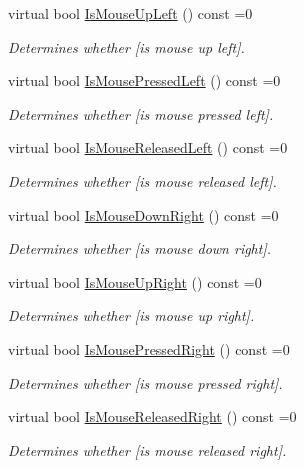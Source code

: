 \begin{DoxyCompactItemize}
virtual bool \hyperlink{class_i_input_handler_a2cfdd78fa0a66dc7a18ad6af3a710c69}{Is\+Mouse\+Up\+Left} () const  =0
\begin{DoxyCompactList}\small\item\em Determines whether \mbox{[}is mouse up left\mbox{]}. \end{DoxyCompactList}\item 
virtual bool \hyperlink{class_i_input_handler_a7bba4c4ed8beb9f01148ae927df6751d}{Is\+Mouse\+Pressed\+Left} () const  =0
\begin{DoxyCompactList}\small\item\em Determines whether \mbox{[}is mouse pressed left\mbox{]}. \end{DoxyCompactList}\item 
virtual bool \hyperlink{class_i_input_handler_a26cd44431cad42b32fbf507d6a6f04ea}{Is\+Mouse\+Released\+Left} () const  =0
\begin{DoxyCompactList}\small\item\em Determines whether \mbox{[}is mouse released left\mbox{]}. \end{DoxyCompactList}\item 
virtual bool \hyperlink{class_i_input_handler_a8c4e43a7249caf8e6edebe3b2f08ead2}{Is\+Mouse\+Down\+Right} () const  =0
\begin{DoxyCompactList}\small\item\em Determines whether \mbox{[}is mouse down right\mbox{]}. \end{DoxyCompactList}\item 
virtual bool \hyperlink{class_i_input_handler_ac182e58a22eea2d389ee14abdfb2c422}{Is\+Mouse\+Up\+Right} () const  =0
\begin{DoxyCompactList}\small\item\em Determines whether \mbox{[}is mouse up right\mbox{]}. \end{DoxyCompactList}\item 
virtual bool \hyperlink{class_i_input_handler_a3401a1b944166c0f134eb07fedc5534c}{Is\+Mouse\+Pressed\+Right} () const  =0
\begin{DoxyCompactList}\small\item\em Determines whether \mbox{[}is mouse pressed right\mbox{]}. \end{DoxyCompactList}\item 
virtual bool \hyperlink{class_i_input_handler_a1765f2f4334d7af321acf3c3ebd786b8}{Is\+Mouse\+Released\+Right} () const  =0
\begin{DoxyCompactList}\small\item\em Determines whether \mbox{[}is mouse released right\mbox{]}. \end{DoxyCompactList}\item 

\end{DoxyCompactItemize}
